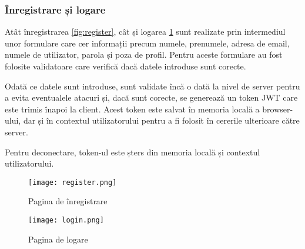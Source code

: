 

\subsubsection{Înregistrare și logare}
Atât înregistrarea \ref{fig:register}, cât și logarea \ref{fig:login} sunt realizate prin
intermediul unor formulare care cer informații precum numele, prenumele, adresa de email,
numele de utilizator, parola și poza de profil. Pentru aceste formulare au fost folosite
validatoare care verifică dacă datele introduse sunt corecte.
\par
Odată ce datele sunt introduse, sunt validate încă o dată la nivel de server pentru a evita 
eventualele atacuri și, dacă sunt corecte, se generează un token JWT care este trimis înapoi
la client. Acest token este salvat în memoria locală a browser-ului, dar și în contextul
utilizatorului pentru a fi folosit în cererile ulterioare către server.
\par
Pentru deconectare, token-ul este șters din memoria locală și contextul utilizatorului.

\begin{figure}[h] 
    \centering
    \begin{minipage}{0.49\textwidth}
        \centering
        \texttt{[image: register.png]}
        \caption{Pagina de înregistrare}
        \label{fig:register}
    \end{minipage}\hfill
    \begin{minipage}{0.49\textwidth}
        \centering
        \texttt{[image: login.png]}
        \caption{Pagina de logare}
        \label{fig:login}
    \end{minipage}
\end{figure}

